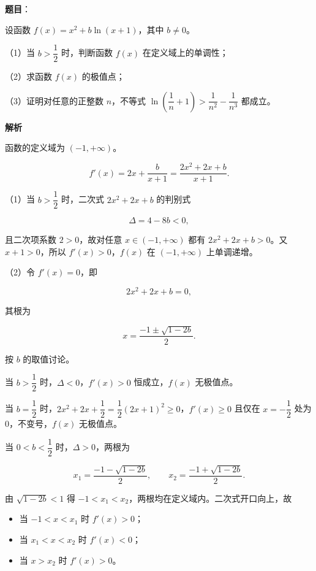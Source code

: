 \begin{answer}

\textbf{题目}：

设函数 $f(x)=x^2+b\ln(x+1)$，其中 $b\neq0$。

（1）当 $b>\dfrac12$ 时，判断函数 $f(x)$ 在定义域上的单调性；

（2）求函数 $f(x)$ 的极值点；

（3）证明对任意的正整数 $n$，不等式 $\ln\left(\dfrac1n+1\right)>\dfrac1{n^2}-\dfrac1{n^3}$ 都成立。

\textbf{解析}

函数的定义域为 $(-1,+\infty)$。

\nopagebreak[4]
\[f'(x)=2x+\frac{b}{x+1}=\frac{2x^2+2x+b}{x+1}.\]

（1）当 $b>\dfrac12$ 时，二次式 $2x^2+2x+b$ 的判别式

\nopagebreak[4]
\[\Delta=4-8b<0,\]

且二次项系数 $2>0$，故对任意 $x\in(-1,+\infty)$ 都有 $2x^2+2x+b>0$。又 $x+1>0$，所以 $f'(x)>0$，$f(x)$ 在 $(-1,+\infty)$ 上单调递增。

（2）令 $f'(x)=0$，即

\nopagebreak[4]
\[2x^2+2x+b=0,\]

其根为

\nopagebreak[4]
\[x=\frac{-1\pm\sqrt{1-2b}}{2}.\]

按 $b$ 的取值讨论。

当 $b>\dfrac12$ 时，$\Delta<0$，$f'(x)>0$ 恒成立，$f(x)$ 无极值点。

当 $b=\dfrac12$ 时，$2x^2+2x+\dfrac12=\dfrac12(2x+1)^2\geqslant0$，$f'(x)\geqslant0$ 且仅在 $x=-\dfrac12$ 处为 $0$，不变号，$f(x)$ 无极值点。

当 $0<b<\dfrac12$ 时，$\Delta>0$，两根为

\nopagebreak[4]
\[x_1=\frac{-1-\sqrt{1-2b}}{2},\qquad x_2=\frac{-1+\sqrt{1-2b}}{2}.\]

由 $\sqrt{1-2b}<1$ 得 $-1<x_1<x_2$，两根均在定义域内。二次式开口向上，故

\begin{itemize}
\item 当 $-1<x<x_1$ 时 $f'(x)>0$；
\item 当 $x_1<x<x_2$ 时 $f'(x)<0$；
\item 当 $x>x_2$ 时 $f'(x)>0$。
\end{itemize}


\end{answer}
